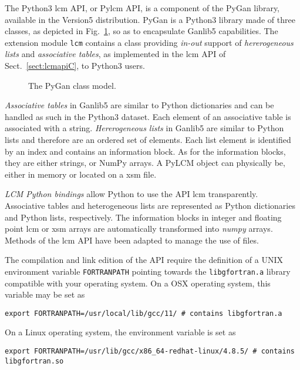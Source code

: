 The Python3 {\sc lcm} API, or Py{\sc lcm} API, is a component of the PyGan library, available in the Version5 distribution.
PyGan is a Python3 library made of three classes, as depicted in Fig.~\ref{fig:PyGan}, so as to encapsulate Ganlib5 capabilities.
The extension module {\tt lcm} contains a class providing {\sl in-out} support of {\sl hererogeneous lists} and
{\sl associative tables}, as implemented in the {\sc lcm} API of Sect.~\ref{sect:lcmapiC}, to Python3 users.

\begin{figure}[htbp]
\begin{center}
\epsfxsize=2.4cm
\centerline{ }
\parbox{12cm}{\caption{The PyGan class model.}\label{fig:PyGan}}
\end{center}  
\end{figure}

\vskip 0.2cm

{\sl Associative tables} in Ganlib5 are similar to Python dictionaries and can be handled
as such in the Python3 dataset.  Each element of an associative table
 is associated with a string.
{\sl Hererogeneous lists} in Ganlib5 are similar to Python lists and therefore are an ordered set
of elements. Each list element is identified by an index and contains
an information block. As for the information blocks, they are either
strings, or NumPy arrays.
A PyLCM object can physically be, either in memory or located on a {\sc xsm} file.

\vskip 0.2cm

{\sl LCM Python bindings} allow Python to use the API
{\sc lcm} transparently. Associative tables and heterogeneous lists are
represented as Python dictionaries and Python lists, respectively. The
information blocks in integer and floating point {\sc lcm} or {\sc xsm} arrays
are automatically transformed into {\sl numpy} arrays.
Methods of the {\sc lcm} API have been adapted to manage the use of files.

\vskip 0.2cm

The compilation and link edition of the API require the definition of a UNIX environment variable {\tt FORTRANPATH} pointing towards the {\tt libgfortran.a} library
compatible with your operating system. On a OSX operating system, this variable may be set as
\begin{verbatim}
export FORTRANPATH=/usr/local/lib/gcc/11/ # contains libgfortran.a
\end{verbatim}
\noindent On a Linux operating system, the environment variable is set as
\begin{verbatim}
export FORTRANPATH=/usr/lib/gcc/x86_64-redhat-linux/4.8.5/ # contains libgfortran.so
\end{verbatim}

